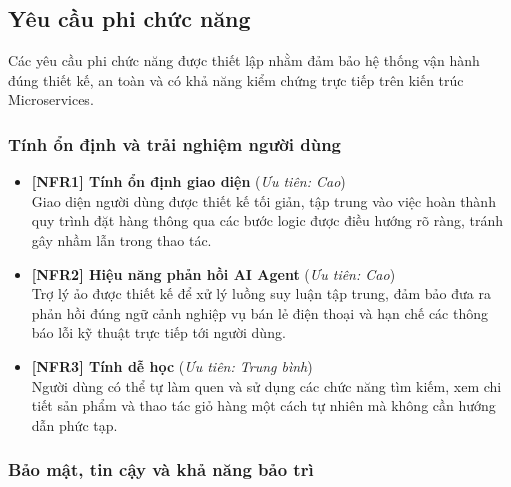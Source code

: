 \subsection{Yêu cầu phi chức năng}

Các yêu cầu phi chức năng được thiết lập nhằm đảm bảo hệ thống vận hành đúng thiết kế, an toàn và có khả năng kiểm chứng trực tiếp trên kiến trúc Microservices.

\subsubsection{Tính ổn định và trải nghiệm người dùng}

\begin{itemize}
    \item \textbf{[NFR1] Tính ổn định giao diện} \hfill (\textit{Ưu tiên: Cao})\\
    Giao diện người dùng được thiết kế tối giản, tập trung vào việc hoàn thành quy trình đặt hàng thông qua các bước logic được điều hướng rõ ràng, tránh gây nhầm lẫn trong thao tác.

    \item \textbf{[NFR2] Hiệu năng phản hồi AI Agent} \hfill (\textit{Ưu tiên: Cao})\\
    Trợ lý ảo được thiết kế để xử lý luồng suy luận tập trung, đảm bảo đưa ra phản hồi đúng ngữ cảnh nghiệp vụ bán lẻ điện thoại và hạn chế các thông báo lỗi kỹ thuật trực tiếp tới người dùng.

    \item \textbf{[NFR3] Tính dễ học} \hfill (\textit{Ưu tiên: Trung bình})\\
    Người dùng có thể tự làm quen và sử dụng các chức năng tìm kiếm, xem chi tiết sản phẩm và thao tác giỏ hàng một cách tự nhiên mà không cần hướng dẫn phức tạp.
\end{itemize}

\subsubsection{Bảo mật, tin cậy và khả năng bảo trì}

